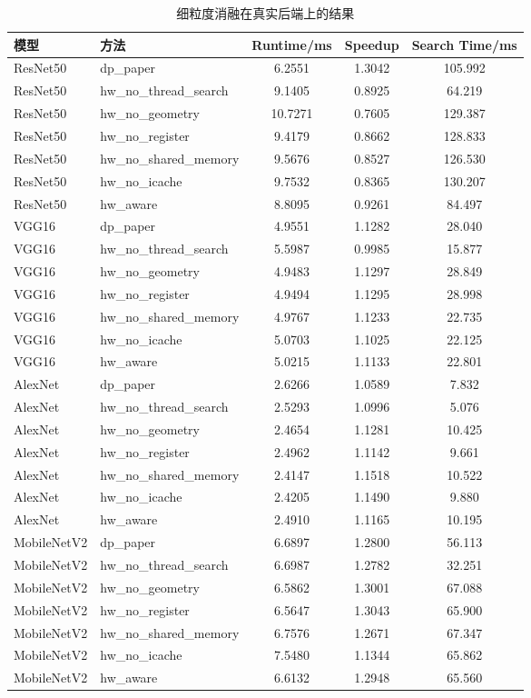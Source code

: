 \begin{table}[htbp]
\centering
\caption{细粒度消融在真实后端上的结果}
\label{tab:generalization_ablation}
\begin{tabular}{l l c c c}
\hline
模型 & 方法 & Runtime/ms & Speedup & Search Time/ms \\
\hline
ResNet50 & dp\_paper & 6.2551 & 1.3042 & 105.992 \\
ResNet50 & hw\_no\_thread\_search & 9.1405 & 0.8925 & 64.219 \\
ResNet50 & hw\_no\_geometry & 10.7271 & 0.7605 & 129.387 \\
ResNet50 & hw\_no\_register & 9.4179 & 0.8662 & 128.833 \\
ResNet50 & hw\_no\_shared\_memory & 9.5676 & 0.8527 & 126.530 \\
ResNet50 & hw\_no\_icache & 9.7532 & 0.8365 & 130.207 \\
ResNet50 & hw\_aware & 8.8095 & 0.9261 & 84.497 \\
\hline
VGG16 & dp\_paper & 4.9551 & 1.1282 & 28.040 \\
VGG16 & hw\_no\_thread\_search & 5.5987 & 0.9985 & 15.877 \\
VGG16 & hw\_no\_geometry & 4.9483 & 1.1297 & 28.849 \\
VGG16 & hw\_no\_register & 4.9494 & 1.1295 & 28.998 \\
VGG16 & hw\_no\_shared\_memory & 4.9767 & 1.1233 & 22.735 \\
VGG16 & hw\_no\_icache & 5.0703 & 1.1025 & 22.125 \\
VGG16 & hw\_aware & 5.0215 & 1.1133 & 22.801 \\
\hline
AlexNet & dp\_paper & 2.6266 & 1.0589 & 7.832 \\
AlexNet & hw\_no\_thread\_search & 2.5293 & 1.0996 & 5.076 \\
AlexNet & hw\_no\_geometry & 2.4654 & 1.1281 & 10.425 \\
AlexNet & hw\_no\_register & 2.4962 & 1.1142 & 9.661 \\
AlexNet & hw\_no\_shared\_memory & 2.4147 & 1.1518 & 10.522 \\
AlexNet & hw\_no\_icache & 2.4205 & 1.1490 & 9.880 \\
AlexNet & hw\_aware & 2.4910 & 1.1165 & 10.195 \\
\hline
MobileNetV2 & dp\_paper & 6.6897 & 1.2800 & 56.113 \\
MobileNetV2 & hw\_no\_thread\_search & 6.6987 & 1.2782 & 32.251 \\
MobileNetV2 & hw\_no\_geometry & 6.5862 & 1.3001 & 67.088 \\
MobileNetV2 & hw\_no\_register & 6.5647 & 1.3043 & 65.900 \\
MobileNetV2 & hw\_no\_shared\_memory & 6.7576 & 1.2671 & 67.347 \\
MobileNetV2 & hw\_no\_icache & 7.5480 & 1.1344 & 65.862 \\
MobileNetV2 & hw\_aware & 6.6132 & 1.2948 & 65.560 \\
\hline
\end{tabular}
\end{table}
